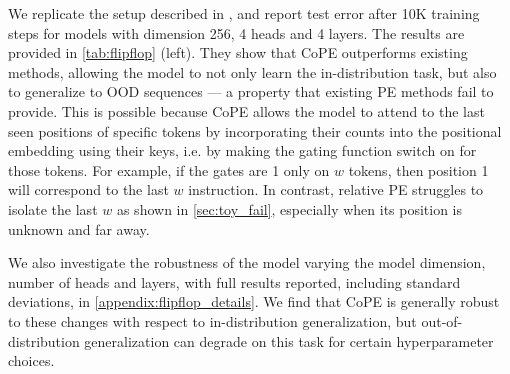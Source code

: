 \documentclass{article}
\newcommand{\ours}{CoPE\xspace}
\begin{document}
We replicate the setup described in \cite{liu2024exposing}, and report test error after 10K training steps
for models with dimension 256, 4 heads and 4 layers.
The results are provided in \cref{tab:flipflop} (left).
They show that \ours{} outperforms existing methods, allowing the model to not only learn the in-distribution task, but also to generalize to OOD sequences --- a property that existing PE methods fail to provide. This is possible because \ours{} allows the model to attend to the last seen  positions of specific tokens
by incorporating their counts 
into the positional embedding using their keys, i.e. by making the gating function switch on for those tokens. For example, if the gates are 1 only on $w$ tokens, then position 1 will correspond to the last $w$ instruction.
In contrast, relative PE  struggles to isolate the last $w$ as shown in \cref{sec:toy_fail}, especially when its position is unknown and far away.

We also investigate the robustness of the model varying the model dimension, number of heads and layers, with full results reported, including standard deviations, in \cref{appendix:flipflop_details}. 
We find that \ours{} is generally robust to these changes with respect to in-distribution generalization, but out-of-distribution generalization can degrade on this task for certain hyperparameter choices.
\end{document}
